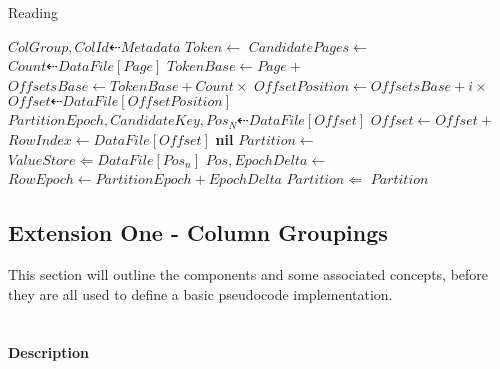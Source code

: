 \documentclass[fleqn]{article}
\begin{document}
\begin{algorithm}
\scriptsize
\caption{Reading}
\begin{algorithmic}[2]
\State $ColGroup, ColId \dashleftarrow Metadata$
\State $Token \gets $ 
\State $CandidatePages \gets $
 \State $Count \dashleftarrow DataFile[Page]$
 \State $TokenBase \gets Page +  $ 
 \State $OffsetsBase \gets TokenBase + Count \times $
 \For{$i \gets $ \Call{Find}{$DataFile[TokenBase \dots OffsetBase), Token$}}
  \State $OffsetPosition \gets OffsetsBase + i \times $ 
  \State $Offset \dashleftarrow DataFile[OffsetPosition]$
  \State $PartitionEpoch, CandidateKey, Pos_N \dashleftarrow DataFile[Offset]$
   \State $Offset \gets Offset + $ 
   \State $RowIndex \gets DataFile[Offset]$
   \State \Return {}
  \EndIf
 \EndFor
\EndFor
\Return \textbf{nil}
\EndFunction
\Statex
{}
\State $Partition \gets $ 
\State $ValueStore \Leftarrow DataFile[Pos_n]$
 \State $Pos, EpochDelta \gets$ 
 \State $RowEpoch \gets PartitionEpoch + EpochDelta$
 \State $Partition \Leftarrow $ 
\EndFor
\Return $Partition$
\EndFunction
\end{algorithmic}
\end{algorithm}

\clearpage
\subsection{Extension One - Column Groupings}
\small
This section will outline the components and some associated concepts, before they are all used to define 
a basic pseudocode implementation.
\\\\
\paragraph{Description}
\end{document}
